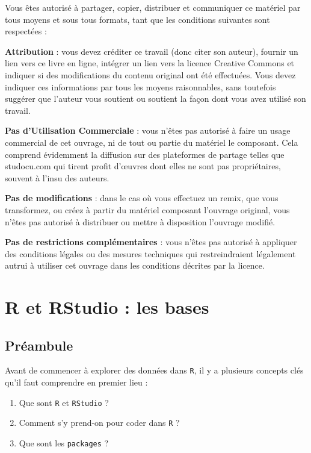 \documentclass[
  a4paper,
  DIV=11,
  numbers=noendperiod,
  oneside]{scrreprt}
\providecommand{\tightlist}{%
  \setlength{\itemsep}{0pt}\setlength{\parskip}{0pt}}\usepackage{longtable,booktabs,array}
\begin{document}
Vous êtes autorisé à partager, copier, distribuer et communiquer ce
matériel par tous moyens et sous tous formats, tant que les conditions
suivantes sont respectées :

{} \textbf{Attribution} : vous devez
créditer ce travail (donc citer son auteur), fournir un lien vers ce
livre en ligne, intégrer un lien vers la licence Creative Commons et
indiquer si des modifications du contenu original ont été effectuées.
Vous devez indiquer ces informations par tous les moyens raisonnables,
sans toutefois suggérer que l'auteur vous soutient ou soutient la façon
dont vous avez utilisé son travail.

{} \textbf{Pas d'Utilisation Commerciale}
: vous n'êtes pas autorisé à faire un usage commercial de cet ouvrage,
ni de tout ou partie du matériel le composant. Cela comprend évidemment
la diffusion sur des plateformes de partage telles que studocu.com qui
tirent profit d'œuvres dont elles ne sont pas propriétaires, souvent à
l'insu des auteurs.

{} \textbf{Pas de modifications} : dans le
cas où vous effectuez un remix, que vous transformez, ou créez à partir
du matériel composant l'ouvrage original, vous n'êtes pas autorisé à
distribuer ou mettre à disposition l'ouvrage modifié.

{} \textbf{Pas de restrictions complémentaires} :
vous n'êtes pas autorisé à appliquer des conditions légales ou des
mesures techniques qui restreindraient légalement autrui à utiliser cet
ouvrage dans les conditions décrites par la licence.


\chapter{R et RStudio : les bases}\label{sec-basics}

\section{Préambule}\label{pruxe9ambule}

Avant de commencer à explorer des données dans \texttt{R}, il y a
plusieurs concepts clés qu'il faut comprendre en premier lieu :

\begin{enumerate}
\def\labelenumi{\arabic{enumi}.}
\tightlist
\item
  Que sont \texttt{R} et \texttt{RStudio} ?
\item
  Comment s'y prend-on pour coder dans \texttt{R} ?
\item
  Que sont les \texttt{packages} ?
\end{enumerate}
\end{document}
